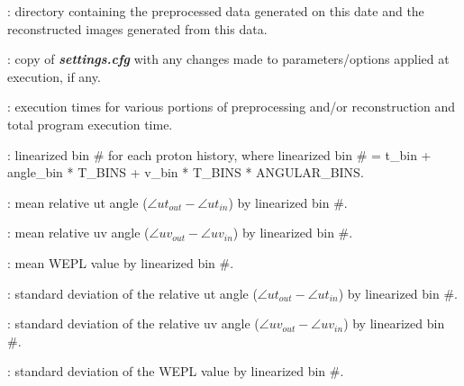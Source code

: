 \documentclass[landscape,12pt]{article}
\begin{document}
\begin{myEnumerate}[labelindent=1pt, leftmargin=*]
\begin{myEnumerate}[labelindent=1pt, leftmargin=*]
\begin{myEnumerate}[labelindent=1pt, leftmargin=*]
\begin{myEnumerate}[labelindent=1pt, leftmargin=*]
\begin{myEnumerate}[labelindent=1pt, leftmargin=*]
\begin{myEnumerate}[labelindent=1pt, leftmargin=*]
\begin{myEnumerate}[labelindent=1pt, leftmargin=*]
\begin{myEnumerate}[labelindent=1pt, leftmargin=*]
                                    \item {} \color{Black}: directory containing the preprocessed data generated on this date and the reconstructed images generated from this data.
                                    \begin{myEnumerate}[labelindent=1pt, leftmargin=*]
                                        \item {} \color{Black}: copy of \textbf{\textit{settings.cfg}} with any changes made to parameters/options applied at execution, if any.
                                        \item {} \color{Black}: execution times for various portions of preprocessing and/or reconstruction and total program execution time.
                                        \item {} \color{Black}: linearized bin \# for each proton history, where linearized bin \# = t\_bin + angle\_bin * T\_BINS + v\_bin * T\_BINS * ANGULAR\_BINS.\\
                                        \item { \color{Black}: mean relative ut angle ($\angle ut_{out} -\angle ut_{in}$) by linearized bin \#.}\\
                                        \item {} \color{Black}: mean relative uv angle ($\angle uv_{out} -\angle uv_{in}$) by linearized bin \#.
                                        \item {} \color{Black}: mean WEPL value by linearized bin \#.
                                        \item {} \color{Black}: standard deviation of the relative ut angle ($\angle ut_{out} -\angle ut_{in}$) by linearized bin \#.
                                        \item {} \color{Black}: standard deviation of the relative uv angle ($\angle uv_{out} -\angle uv_{in}$) by linearized bin \#.
                                        \item {} \color{Black}: standard deviation of the WEPL value by linearized bin \#.

\end{myEnumerate}
\end{myEnumerate}
\end{myEnumerate}
\end{myEnumerate}
\end{myEnumerate}
\end{myEnumerate}
\end{myEnumerate}
\end{myEnumerate}
\end{myEnumerate}
\end{document}

